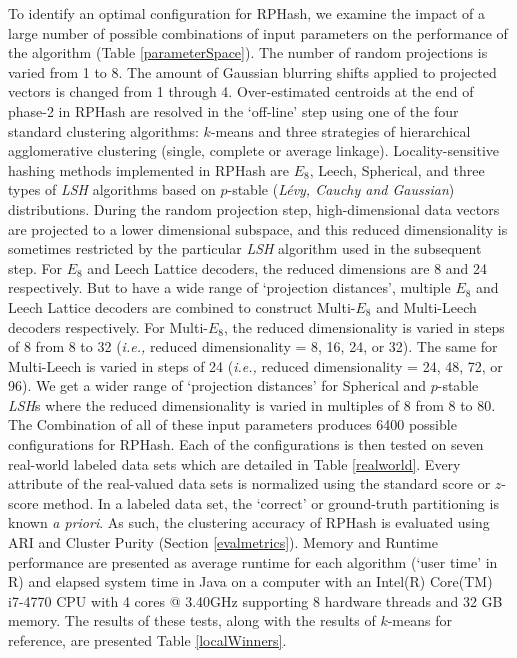 To identify an optimal configuration for \textsf{RPHash}, we examine the impact of a large number of
possible combinations of input parameters on the performance of the algorithm (Table
\ref{parameterSpace}).  The number of random projections is varied from 1 to 8.  The amount of
Gaussian blurring shifts applied to projected vectors is changed from 1 through 4.  Over-estimated
centroids at the end of phase-2 in \textsf{RPHash} are resolved in the `off-line' step using one of
the four standard clustering algorithms: $k$-means \cite{Hartigan} and three strategies of
hierarchical agglomerative clustering (single, complete or average linkage).  Locality-sensitive
hashing methods implemented in \textsf{RPHash} are $E_8$, Leech, Spherical, and three types of
\emph{LSH} algorithms based on $p$-stable (\emph{L\'{e}vy, Cauchy and Gaussian}) distributions.
During the random projection step, high-dimensional data vectors are projected to a lower
dimensional subspace, and this reduced dimensionality is sometimes restricted by the particular
\emph{LSH} algorithm used in the subsequent step.  For $E_8$ and Leech Lattice decoders, the reduced
dimensions are 8 and 24 respectively.  But to have a wide range of `projection distances', multiple
$E_8$ and Leech Lattice decoders are combined to construct Multi-$E_8$ and Multi-Leech decoders
respectively.  For Multi-$E_8$, the reduced dimensionality is varied in steps of 8 from 8 to 32
(\textit{i.e.,} reduced dimensionality = 8, 16, 24, or 32).  The same for Multi-Leech is varied in
steps of 24 (\emph{i.e.,} reduced dimensionality = 24, 48, 72, or 96).  We get a wider range of
`projection distances' for Spherical and $p$-stable \emph{LSH}s where the reduced dimensionality is
varied in multiples of 8 from 8 to 80.  The Combination of all of these input parameters produces
6400 possible configurations for \textsf{RPHash}.  Each of the configurations is then tested on
seven real-world labeled data sets which are detailed in Table \ref{realworld}.  Every attribute of
the real-valued data sets is normalized using the standard score or $z$-score method.  In a labeled
data set, the `correct' or ground-truth partitioning is known \emph{a priori}.  As such, the
clustering accuracy of \textsf{RPHash} is evaluated using ARI and Cluster Purity (Section
\ref{evalmetrics}).  Memory and Runtime performance are presented as average runtime for each
algorithm (`user time' in R) and elapsed system time in Java on a computer with an Intel(R) Core(TM)
i7-4770 CPU with 4 cores @ 3.40GHz supporting 8 hardware threads and 32 GB memory.  The results of
these tests, along with the results of $k$-means for reference, are presented Table
\ref{localWinners}.

